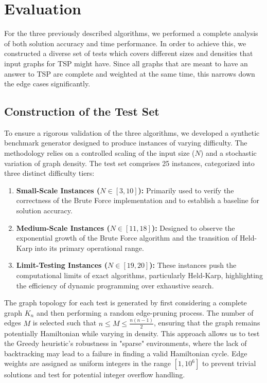 \section{Evaluation}
\label{sec:evaluation}

For the three previously described algorithms, we performed a complete analysis of both solution accuracy and time performance. In order to 
achieve this, we constructed a diverse set of tests which covers different sizes and densities that input graphs for TSP might have. Since 
all graphs that are meant to have an answer to TSP are complete and weighted at the same time, this narrows down the edge cases significantly.

\subsection{Construction of the Test Set}
\label{subsec:tests}

To ensure a rigorous validation of the three algorithms, we developed a synthetic benchmark generator designed to produce instances of varying difficulty. The methodology relies on a controlled scaling of the input size ($N$) and a stochastic variation of graph density. The test set comprises 25 instances, categorized into three distinct difficulty tiers:

\begin{enumerate}
    \item \textbf{Small-Scale Instances ($N \in [3, 10]$):} Primarily used to verify the correctness of the Brute Force implementation and to establish a baseline for solution accuracy.
    \item \textbf{Medium-Scale Instances ($N \in [11, 18]$):} Designed to observe the exponential growth of the Brute Force algorithm and the transition of Held-Karp into its primary operational range.
    \item \textbf{Limit-Testing Instances ($N \in [19, 20]$):} These instances push the computational limits of exact algorithms, particularly Held-Karp, highlighting the efficiency of dynamic programming over exhaustive search.
\end{enumerate}

The graph topology for each test is generated by first considering a complete graph $K_n$ and then performing a random edge-pruning process. The number of edges $M$ is selected such that $n \le M \le \frac{n(n-1)}{2}$, ensuring that the graph remains potentially Hamiltonian while varying in density. This approach allows us to test the Greedy heuristic's robustness in "sparse" environments, where the lack of backtracking may lead to a failure in finding a valid Hamiltonian cycle. Edge weights are assigned as uniform integers in the range $[1, 10^6]$ to prevent trivial solutions and test for potential integer overflow handling.


